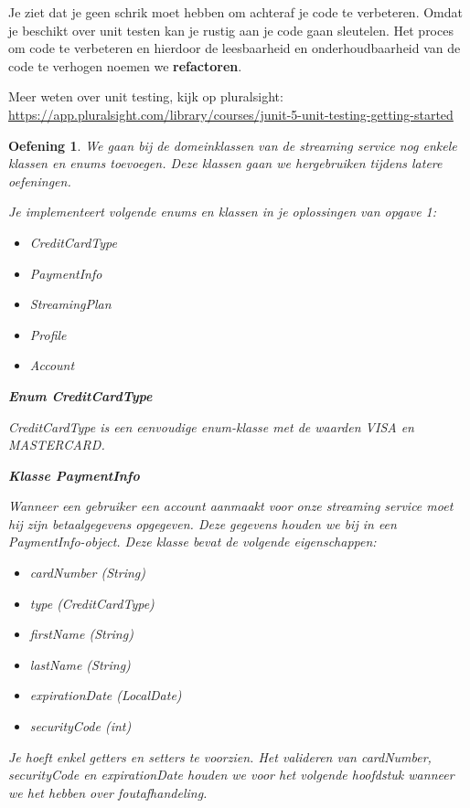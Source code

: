 \documentclass{tstextbook}
\newtheorem{envoefening}{Oefening}[chapter]
\newenvironment{oefening}
               {\begin{boxexercise}\begin{envoefening}}
               {\end{envoefening}\end{boxexercise}}
\begin{document}
Je ziet dat je geen schrik moet hebben om achteraf je code te verbeteren. Omdat je beschikt over unit testen kan je rustig aan je code gaan sleutelen. Het proces om code te verbeteren en hierdoor de leesbaarheid en onderhoudbaarheid van de code te verhogen noemen we \textbf{refactoren}. 

\begin{remark}
  Meer weten over unit testing, kijk op pluralsight: \url{https://app.pluralsight.com/library/courses/junit-5-unit-testing-getting-started}
\end{remark}

\begin{oefening}
We gaan bij de domeinklassen van de streaming service nog enkele klassen en enums toevoegen. Deze klassen gaan we hergebruiken tijdens latere oefeningen. 

Je implementeert volgende enums en klassen in je oplossingen van opgave 1:
\begin{itemize}
\item CreditCardType
\item PaymentInfo
\item StreamingPlan
\item Profile
\item Account
\end{itemize}

\textbf{Enum CreditCardType}

CreditCardType is een eenvoudige enum-klasse met de waarden VISA en MASTERCARD.

\textbf{Klasse PaymentInfo}

Wanneer een gebruiker een account aanmaakt voor onze streaming service moet hij zijn betaalgegevens opgegeven. Deze gegevens houden we bij in een PaymentInfo-object.
Deze klasse bevat de volgende eigenschappen:

\begin{itemize}
\item cardNumber (String)
\item type (CreditCardType)
\item firstName (String)
\item lastName (String)
\item expirationDate (LocalDate)
\item securityCode (int)
\end{itemize}

Je hoeft enkel getters en setters te voorzien. Het valideren van cardNumber, securityCode en expirationDate houden we voor het volgende hoofdstuk wanneer we het hebben over foutafhandeling.


\end{oefening}
\end{document}
